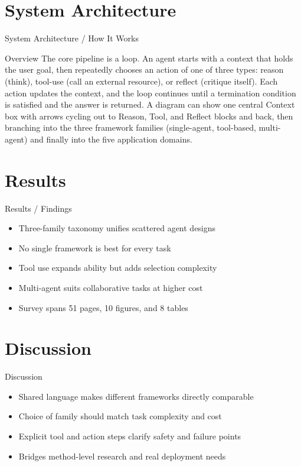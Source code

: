 \documentclass[10pt]{beamer}
\begin{document}
\section{System Architecture}
\begin{frame}{System Architecture / How It Works}
  \begin{block}{Overview}
  The core pipeline is a loop. An agent starts with a context that holds the user goal, then repeatedly chooses an action of one of three types: reason (think), tool-use (call an external resource), or reflect (critique itself). Each action updates the context, and the loop continues until a termination condition is satisfied and the answer is returned. A diagram can show one central Context box with arrows cycling out to Reason, Tool, and Reflect blocks and back, then branching into the three framework families (single-agent, tool-based, multi-agent) and finally into the five application domains.
  \end{block}
\end{frame}

\section{Results}
\begin{frame}[allowframebreaks]{Results / Findings}
\begin{itemize}
  \item Three-family taxonomy unifies scattered agent designs
  \item No single framework is best for every task
  \item Tool use expands ability but adds selection complexity
  \item Multi-agent suits collaborative tasks at higher cost
  \item Survey spans 51 pages, 10 figures, and 8 tables
\end{itemize}
\end{frame}

\section{Discussion}
\begin{frame}{Discussion}
\begin{itemize}
  \item Shared language makes different frameworks directly comparable
  \item Choice of family should match task complexity and cost
  \item Explicit tool and action steps clarify safety and failure points
  \item Bridges method-level research and real deployment needs
\end{itemize}
\end{frame}
\end{document}
